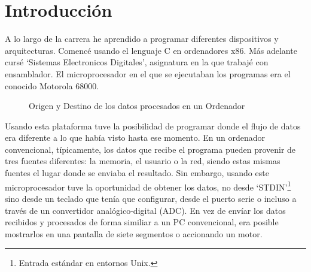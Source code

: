 \section{Introducción}
A lo largo de la carrera he aprendido a programar diferentes dispositivos y arquitecturas. Comencé usando el lenguaje C en ordenadores x86.  Más adelante cursé `Sistemas Electronicos Digitales', asignatura en la que trabajé con ensamblador.  El microprocesador en el que se ejecutaban los programas era el conocido Motorola 68000.

\begin{figure}[H]
\begin{center}
\end{center}
\caption{Origen y Destino de los datos procesados en un Ordenador}
\label{io_pc}
\end{figure}
Usando esta plataforma tuve la posibilidad de programar donde el flujo de datos era diferente a lo que había visto hasta ese momento.  En un ordenador convencional, típicamente, los datos que recibe el programa pueden provenir de tres fuentes diferentes: la memoria, el usuario o la red, siendo estas mismas fuentes el lugar donde se enviaba el resultado.  Sin embargo, usando este microprocesador tuve la oportunidad de obtener los datos, no desde `STDIN'\footnote{Entrada estándar en entornos Unix.} sino desde un teclado que tenía que configurar, desde el puerto serie o incluso a través de un convertidor analógico-digital (ADC).  En vez de envíar los datos recibidos y procesados de forma similiar a un PC convencional, era posible mostrarlos en una pantalla de siete segmentos o accionando un motor.  
